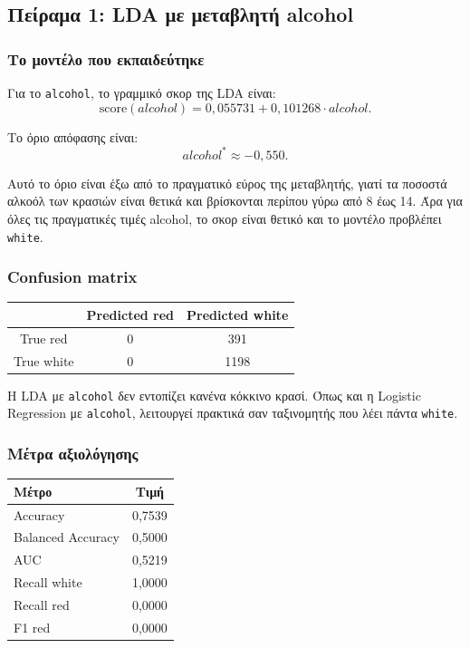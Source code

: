 \documentclass[11pt,a4paper]{article}
\newcommand{\code}[1]{\texttt{#1}}
\begin{document}
\subsection{Πείραμα 1: LDA με μεταβλητή alcohol}

\subsubsection{Το μοντέλο που εκπαιδεύτηκε}

Για το \code{alcohol}, το γραμμικό σκορ της LDA είναι:
\[
\text{score}(alcohol) =
0{,}055731 + 0{,}101268 \cdot alcohol.
\]

Το όριο απόφασης είναι:
\[
alcohol^* \approx -0{,}550.
\]

Αυτό το όριο είναι έξω από το πραγματικό εύρος της μεταβλητής, γιατί τα
ποσοστά αλκοόλ των κρασιών είναι θετικά και βρίσκονται περίπου γύρω από 8
έως 14. Άρα για όλες τις πραγματικές τιμές alcohol, το σκορ είναι θετικό και
το μοντέλο προβλέπει \code{white}.

\subsubsection{Confusion matrix}

\begin{center}
\begin{tabular}{c|cc}
\toprule
 & Predicted red & Predicted white \\
\midrule
True red & 0 & 391 \\
True white & 0 & 1198 \\
\bottomrule
\end{tabular}
\end{center}

Η LDA με \code{alcohol} δεν εντοπίζει κανένα κόκκινο κρασί. Όπως και η
Logistic Regression με \code{alcohol}, λειτουργεί πρακτικά σαν ταξινομητής
που λέει πάντα \code{white}.

\subsubsection{Μέτρα αξιολόγησης}

\begin{center}
\begin{tabular}{lc}
\toprule
Μέτρο & Τιμή \\
\midrule
Accuracy & 0,7539 \\
Balanced Accuracy & 0,5000 \\
AUC & 0,5219 \\
Recall white & 1,0000 \\
Recall red & 0,0000 \\
F1 red & 0,0000 \\
\bottomrule
\end{tabular}
\end{center}
\end{document}
